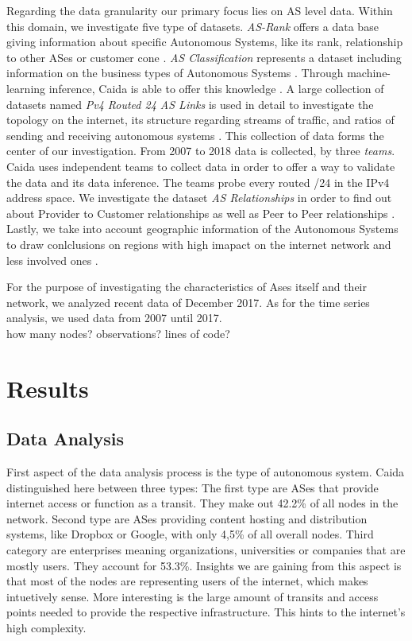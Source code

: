 \documentclass[conference, 11pt]{IEEEtran}
\begin{document}
Regarding the data granularity our primary focus lies on AS level data. Within this domain, we investigate five type of datasets. \textit{AS-Rank} offers a data base giving information about specific Autonomous Systems, like its rank, relationship to other ASes or customer cone  \cite{Rank} . \textit{AS Classification} represents a dataset including information on the business types of Autonomous Systems \cite{Classification}. Through machine-learning inference, Caida is able to offer this knowledge  \cite{Classification}. A large collection of datasets named \textit{Pv4 Routed 24 AS Links} is used in detail to investigate the topology on the internet, its structure regarding streams of traffic, and ratios of sending and receiving autonomous systems  \cite{IPv4Data}. This collection of data forms the center of our investigation. From 2007 to 2018 data is collected, by three \textit{teams}. Caida uses independent teams to collect data in order to offer a way to validate the data and its data inference. The teams probe every routed /24 in the IPv4 address space.
We investigate the dataset \textit{AS Relationships} in order to find out about Provider to Customer relationships as well as Peer to Peer relationships \cite{CaidaRelationshipsData}.  Lastly, we take into account geographic information of the Autonomous Systems to draw conlclusions on regions with high imapact on the internet network and less involved ones  \cite{CaidaGeoData}. 


For the purpose of investigating the characteristics of Ases itself and their network, we analyzed recent data of December 2017.  As for the time series analysis, we used data from 2007 until 2017. \\

how many nodes? observations? lines of code?

\section{Results}

\subsection{Data Analysis}
First aspect of the data analysis process is the type of autonomous system. Caida distinguished here between three types: The first type are ASes that provide internet access or function as a transit. They make out 42.2\% of all nodes in the network. Second type are ASes providing content hosting and distribution systems, like Dropbox or Google, with only 4,5\% of all overall nodes. Third category are enterprises meaning organizations, universities or companies that are mostly users. They account for 53.3\%. Insights we are gaining from this aspect is that most of the nodes are representing users of the internet, which makes intuetively sense. More interesting is the large amount of transits and access points needed to provide the respective infrastructure. This hints to the internet's high complexity. 
\end{document}
